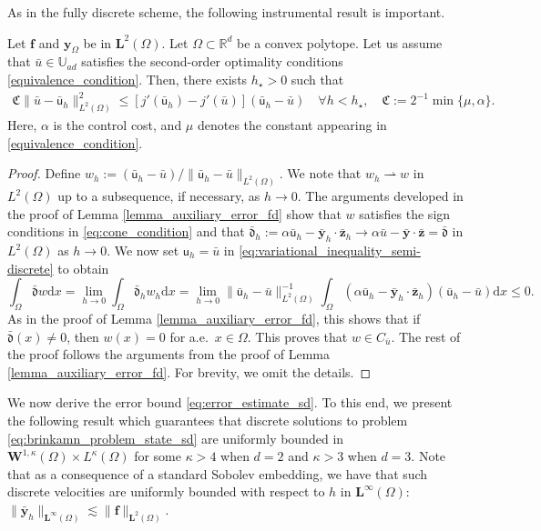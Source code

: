 \documentclass[final]{siamart0216}
\begin{document}
As in the fully discrete scheme, the following instrumental result is important.

\begin{lemma}
\label{lemma_auxiliary_error_sd}
Let $\boldsymbol{\mathbf{f}}$ and $\mathbf{y}_{\Omega}$ be in  $\mathbf{L}^2(\Omega)$. Let $\Omega \subset \mathbb{R}^d$ be a convex polytope. Let us assume that $\bar{u}\in \mathbb{U}_{ad}$ satisfies the second-order optimality conditions \eqref{equivalence_condition}. Then, there exists $h_{\star}>0$ such that
\begin{align}\label{eq:auxiliary_error_estimate_sd}
\mathfrak{C}\|\bar{u}-\bar{\mathsf{u}}_{h}\|_{L^2(\Omega)}^2\leq [j'(\bar{\mathsf{u}}_{h})-j'(\bar{u})](\bar{\mathsf{u}}_{h}-\bar{u})
\quad
\forall h<h_{\star},
\quad
\mathfrak{C}:=2^{-1}\min\{\mu,\alpha\}.
\end{align}
Here, $\alpha$ is the control cost, and $\mu$ denotes the constant appearing in \eqref{equivalence_condition}.
\end{lemma}
\begin{proof}
Define $w_h:=(\bar{\mathsf{u}}_h-\bar{u})/\|\bar{\mathsf{u}}_h-\bar{u}\|_{L^2(\Omega)}$. We note that $w_h \rightharpoonup w$ in $L^2(\Omega)$ up to a subsequence, if necessary, as $h \to 0$. The arguments developed in the proof of Lemma \ref{lemma_auxiliary_error_fd} show that $w$ satisfies the sign conditions in \eqref{eq:cone_condition} and that $\bar{\mathfrak{d}}_h:= \alpha \bar{\mathsf{u}}_h - \bar{\mathbf{y}}_h \cdot \bar{\mathbf{z}}_h \to \alpha \bar{u} - \bar{\mathbf{y}} \cdot \bar{\mathbf{z}} = \bar{\mathfrak{d}}$ in $L^2(\Omega)$ as $h \to 0$. We now set $\mathsf{u}_h = \bar{u}$ in \eqref{eq:variational_inequality_semi-discrete} to obtain
\[
 \int_{\Omega} \bar{\mathfrak{d}} w \mathrm{d}x = \lim_{h \to 0} \int_{\Omega} \bar{\mathfrak{d}}_h w_h \mathrm{d}x = \lim_{h \to 0} \|\bar{\mathsf{u}}_h-\bar{u}\|^{-1}_{L^2(\Omega)} \int_{\Omega} (\alpha \bar{\mathsf{u}}_h - \bar{\mathbf{y}}_h \cdot \bar{\mathbf{z}}_h)(\bar{\mathsf{u}}_h-\bar{u})  \mathrm{d}x \leq 0.
\]
As in the proof of Lemma \ref{lemma_auxiliary_error_fd}, this shows that if $\bar{\mathfrak{d}}(x)\neq 0$, then $w(x)=0$ for a.e.~$x\in\Omega$. This proves that $w\in C_{\bar{u}}$. The rest of the proof follows the arguments from the proof of Lemma \ref{lemma_auxiliary_error_fd}. For brevity, we omit the details.
\end{proof}

We now derive the error bound \eqref{eq:error_estimate_sd}. To this end, we present the following result which guarantees that discrete solutions to problem \eqref{eq:brinkamn_problem_state_sd} are uniformly bounded in $\mathbf{W}^{1,\kappa}(\Omega) \times L^{\kappa}(\Omega)$ for some $\kappa > 4$ when $d=2$ and $\kappa >3$ when $d=3$. Note that as a consequence of a standard Sobolev embedding, we have that such discrete velocities are uniformly bounded with respect to $h$ in $\mathbf{L}^{\infty}(\Omega)$: $\|\bar{\mathbf{y}}_h \|_{\mathbf{L}^{\infty}(\Omega)} \lesssim \| \mathbf{f} \|_{\mathbf{L}^2(\Omega)}$.
\end{document}
